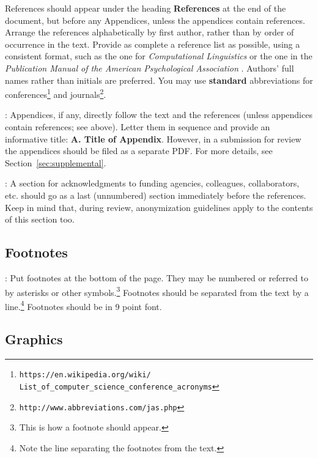 \documentclass[11pt,letterpaper]{article}
\newcommand\BibTeX{B{\sc ib}\TeX}
\begin{document}
References should appear under the heading {\bf References} at the end of
the document, but before any Appendices, unless the appendices contain
references. Arrange the references alphabetically by first author, rather
than by order of occurrence in the text.
Provide as complete a reference list as possible, using a consistent format,
such as the one for {\em Computational Linguistics\/} or the one in the 
{\em Publication Manual of the American Psychological Association\/}
\cite{APA:83}. Authors' full names rather than initials are preferred. You
may use {\bf standard} abbreviations for conferences\footnote{\scriptsize {\tt https://en.wikipedia.org/wiki/ \\ \-\hspace{.75cm} List\_of\_computer\_science\_conference\_acronyms}}
and journals\footnote{\tt http://www.abbreviations.com/jas.php}.

: Appendices, if any, directly follow the text and
the references (unless appendices contain references; see above). Letter
them in sequence and provide an informative title: {\bf A. Title of Appendix}. 
However, in a submission for review the appendices should be filed as a 
separate PDF. For more details, see Section~\ref{sec:supplemental}.

: A section for acknowledgments to funding
agencies, colleagues, collaborators, etc. should go as a last (unnumbered)
section immediately before the references. Keep in mind that, during review,
anonymization guidelines apply to the contents of this section too.

\subsection{Footnotes}

: Put footnotes at the bottom of the page. They may be
numbered or referred to by asterisks or other symbols.\footnote{This is
how a footnote should appear.} Footnotes should be separated from the text
by a line.\footnote{Note the line separating the footnotes from the text.}
Footnotes should be in 9 point font.

\subsection{Graphics}
\end{document}
